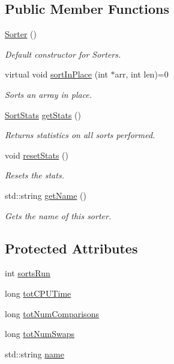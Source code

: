 \subsection*{Public Member Functions}
\begin{DoxyCompactItemize}
\item 
\hyperlink{class_sorter_a0b2a0bc2bae60db1115788f49f988859}{Sorter} ()
\begin{DoxyCompactList}\small\item\em Default constructor for Sorters. \end{DoxyCompactList}\item 
virtual void \hyperlink{class_sorter_a946276dc986c9f017e84986c74e7cf18}{sort\+In\+Place} (int $\ast$arr, int len)=0
\begin{DoxyCompactList}\small\item\em Sorts an array in place. \end{DoxyCompactList}\item 
\hyperlink{struct_sort_stats}{Sort\+Stats} \hyperlink{class_sorter_af864ce19b5f14a410ab55c1af6b4e3a5}{get\+Stats} ()
\begin{DoxyCompactList}\small\item\em Returns statistics on all sorts performed. \end{DoxyCompactList}\item 
void \hyperlink{class_sorter_a085f06b5b3200a426c05fab3eca30dfe}{reset\+Stats} ()
\begin{DoxyCompactList}\small\item\em Resets the stats. \end{DoxyCompactList}\item 
std\+::string \hyperlink{class_sorter_aa7596dcc44254c88e2544708adff0de0}{get\+Name} ()
\begin{DoxyCompactList}\small\item\em Gets the name of this sorter. \end{DoxyCompactList}\end{DoxyCompactItemize}
\subsection*{Protected Attributes}
\begin{DoxyCompactItemize}
\item 
int \hyperlink{class_sorter_a582afc82309a3bf0e5567814b6d61079}{sorts\+Run}
\item 
long \hyperlink{class_sorter_a695f5c4f7455145e9e8574fa5ee39fc4}{tot\+C\+P\+U\+Time}
\item 
long \hyperlink{class_sorter_a28ba087dad25b8c837c1211d8d2cb8f4}{tot\+Num\+Comparisons}
\item 
long \hyperlink{class_sorter_a2fcaa452c03ec3429bedd8de1421e678}{tot\+Num\+Swaps}
\item 
std\+::string \hyperlink{class_sorter_ae86338aba4991d9a1376400733579f4f}{name}
\end{DoxyCompactItemize}


